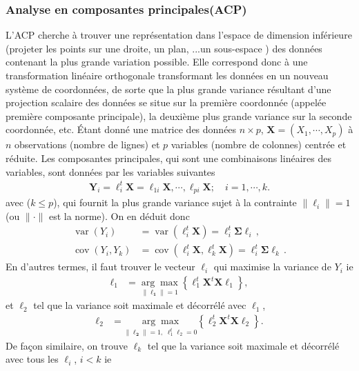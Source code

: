 \subsubsection*{Analyse en composantes principales(ACP)}
%
L'ACP cherche à trouver une représentation dans l’espace de dimension inférieure (projeter les points sur une droite, un plan, ...un sous-espace ) des données contenant la plus grande variation possible. Elle correspond donc à une  transformation linéaire orthogonale transformant les données en un nouveau système de coordonnées, de sorte que la plus grande variance résultant d’une projection scalaire des données se situe sur la première coordonnée (appelée première composante principale), la deuxième plus grande variance sur la seconde coordonnée, etc. \newl
Étant donné une matrice des données $n\times p$, $\textbf{X}=(X_1,\cdots,X_p)$ à $n$ observations (nombre de lignes) et $p$ variables (nombre de colonnes) centrée et réduite. Les composantes principales, qui sont une combinaisons linéaires des variables, sont données par les variables  suivantes
\begin{align*}
\textbf{Y}_i=\ell^t_i\textbf{X}=\ell_{1i}\textbf{X},\cdots,\ell_{pi}\textbf{X};\quad i=1,\cdots,k.
\end{align*}
avec ($k\leq p$), qui fournit la plus grande variance sujet à la contrainte $\|\ell_i\|=1$ (ou $\|\cdot\| $ est la norme). 
On en déduit donc
\begin{align*}
\operatorname{var}\left(Y_{i}\right) &=\operatorname{var}\left(\ell_{i}^{t} \boldsymbol{X}\right)=\ell_{i}^{t} \boldsymbol{\Sigma} \ell_{i} \,,\\ 
\operatorname{cov}\left(Y_{i}, Y_{k}\right) &=\operatorname{cov}\left(\ell_{i}^{t} \boldsymbol{X}, \ell_{k}^{t} \boldsymbol{X}\right)=\ell_{i}^{t} \boldsymbol{\Sigma} \ell_{k}\, .
\end{align*}
En d'autres termes,  il faut 
trouver le vecteur $\ell_{i}$ qui  maximise la variance de $Y_i$  ie 
\begin{align*}
\mathbf{\ell}_{1}&=\underset{\|\mathbf{\ell_1}\|=1}{\arg \max }\left\{\ell^t_1\mathbf{X}^{t} \mathbf{X} \ell_1\right\},
\end{align*}
et $\ell_2$ tel que la variance soit maximale et décorrélé avec $\ell_1$,   
\begin{align*}
\mathbf{\ell}_{2}& =\underset{\|\mathbf{\ell_2}\|=1,\;\ell_{1}^{t}\ell_{2} =0}{\arg \max }\left\{\ell^t_2\mathbf{X}^{t} \mathbf{X} \ell_2\right\}.
\end{align*}
De façon similaire, on trouve $\ell_k$ tel que la variance soit maximale et décorrélé avec tous les $\ell_i$, $i<k$ ie
